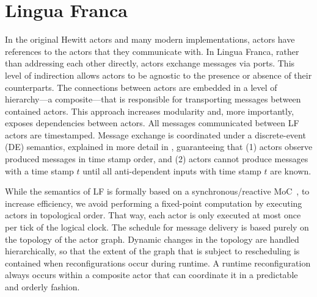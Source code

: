 \documentclass[sigconf]{acmart}
\newcommand{\marten}[1]{\mynote{Marten}{#1}{cyan}}%
\begin{document}
\section{Lingua Franca}
In the original Hewitt actors and many modern implementations, actors have references to the actors that they communicate with.
In Lingua Franca, rather than addressing each other directly, actors exchange messages via ports. This level of indirection allows actors to be agnostic to the presence or absence of their counterparts. The connections between actors are embedded in a level of hierarchy---a composite---that is responsible for transporting messages between contained actors. This approach increases modularity and, more importantly, exposes dependencies between actors.
All messages communicated between LF actors are timestamped. Message exchange is coordinated under a discrete-event (DE) semantics, explained in more detail in \cite{LeeEtAl:7:DiscreteEvents}, guaranteeing that (1) actors observe produced messages in time stamp order, and (2) actors cannot produce messages with a time stamp $t$ until all anti-dependent inputs with time stamp $t$ are known. 

While the semantics of LF is formally based on a synchronous/reactive MoC~\cite{LeeZheng:07:SRDECT}, to increase efficiency, we avoid performing a fixed-point computation by executing actors in topological order. That way, each actor is only executed at most once per tick of the logical clock. The schedule for message delivery is based purely on the topology of the actor graph.
Dynamic changes in the topology are handled hierarchically, so that the extent of the graph that is subject to rescheduling is contained when reconfigurations occur during runtime. A runtime reconfiguration always occurs within a composite actor that can coordinate it in a predictable and orderly fashion. %
\end{document}
